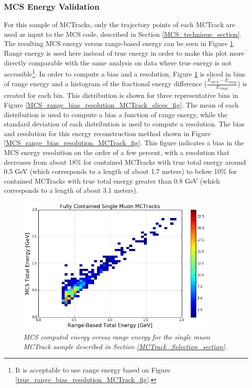 \subsubsection{MCS Energy Validation}\label{MCS_Energy_Validation_MCTrack_section}
For this sample of {\sc MCTracks}, only the trajectory points of each {\sc MCTrack} are used as input to the MCS code, described in Section \ref{MCS_technique_section}. The resulting MCS energy versus range-based energy can be seen in Figure \ref{MCS_range_energy_MCTrack_fig}. Range energy is used here instead of true energy in order to make this plot more directly comparable with the same analysis on data where true energy is not accessible\footnote{It is acceptable to use range energy based on Figure \ref{true_range_bias_resolution_MCTrack_fig}.}. In order to compute a bias and a resolution, Figure \ref{MCS_range_energy_MCTrack_fig} is sliced in bins of range energy and a histogram of the fractional energy difference ($\frac{E_{MCS} - E_{range}}{E_{range}}$) is created for each bin. This distribution is shown for three representative bins in Figure \ref{MCS_range_bias_resolution_MCTrack_slices_fig}. The mean of each distribution is used to compute a bias a function of range energy, while the standard deviation of each distribution is used to compute a resolution. The bias and resolution for this energy reconstruction method shown in Figure \ref{MCS_range_bias_resolution_MCTrack_fig}. This figure indicates a bias in the MCS energy resolution on the order of a few percent, with a resolution that decreases from about 18\% for contained {\sc MCTracks} with true total energy around 0.5 GeV (which corresponds to a length of about 1.7 meters) to below 10\% for contained {\sc MCTracks} with true total energy greater than 0.8 GeV (which corresponds to a length of about 3.1 meters).


\begin{figure}[h!]
\begin{center}
\includegraphics[width=100mm]{Figures/MCS_range_comparison_MCTracks.png}
\end{center}
\caption{\textit{MCS computed energy versus range energy for the single muon {\sc MCTrack} sample described in Section \ref{MCTrack_Selection_section}.}}
\label{MCS_range_energy_MCTrack_fig}
\end{figure}

